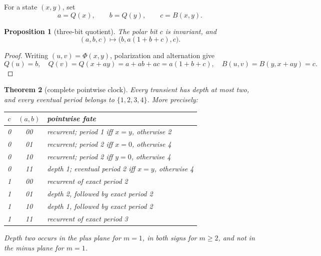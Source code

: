 \documentclass[10pt,a4paper]{amsart}
\newtheorem{theorem}{Theorem}[section]
\newtheorem{proposition}[theorem]{Proposition}
\theoremstyle{definition}
\theoremstyle{remark}
\numberwithin{equation}{section}
\begin{document}
For a state \((x,y)\), set
\[
                  a=Q(x),\qquad b=Q(y),\qquad c=B(x,y).
\]

\begin{proposition}[three-bit quotient]\label{prop:quotient}
The polar bit \(c\) is invariant, and
\begin{equation}
          (a,b,c)\longmapsto\bigl(b,a(1+b+c),c\bigr).     \label{eq:quotient}
\end{equation}
\end{proposition}

\begin{proof}
Writing \((u,v)=\Phi(x,y)\), polarization and alternation give
\[
 Q(u)=b,\quad Q(v)=Q(x+ay)=a+ab+ac=a(1+b+c),\quad
 B(u,v)=B(y,x+ay)=c.
\]
\end{proof}

\begin{theorem}[complete pointwise clock]\label{thm:clock}
Every transient has depth at most two, and every eventual period belongs to
\(\{1,2,3,4\}\).  More precisely:
\begin{center}
\small
\begin{tabular}{@{}ccl@{}}
\toprule
\(c\)&\((a,b)\)& pointwise fate\\
\midrule
0&00& recurrent; period 1 iff \(x=y\), otherwise 2\\
0&01& recurrent; period 2 iff \(x=0\), otherwise 4\\
0&10& recurrent; period 2 iff \(y=0\), otherwise 4\\
0&11& depth 1; eventual period 2 iff \(x=y\), otherwise 4\\
1&00& recurrent of exact period 2\\
1&01& depth 2, followed by exact period 2\\
1&10& depth 1, followed by exact period 2\\
1&11& recurrent of exact period 3\\
\bottomrule
\end{tabular}
\end{center}
Depth two occurs in the plus plane for \(m=1\), in both signs for \(m\ge2\),
and not in the minus plane for \(m=1\).
\end{theorem}
\end{document}
